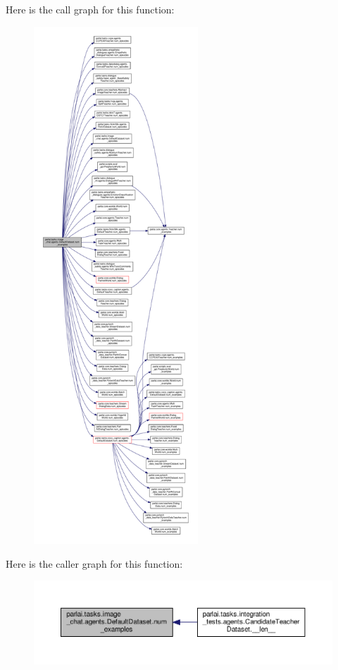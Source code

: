Here is the call graph for this function\+:
\nopagebreak
\begin{figure}[H]
\begin{center}
\leavevmode
\includegraphics[height=550pt]{classparlai_1_1tasks_1_1image__chat_1_1agents_1_1DefaultDataset_a50e9a914fa61e0070403b5806a9c392b_cgraph}
\end{center}
\end{figure}
Here is the caller graph for this function\+:
\nopagebreak
\begin{figure}[H]
\begin{center}
\leavevmode
\includegraphics[width=350pt]{classparlai_1_1tasks_1_1image__chat_1_1agents_1_1DefaultDataset_a50e9a914fa61e0070403b5806a9c392b_icgraph}
\end{center}
\end{figure}
